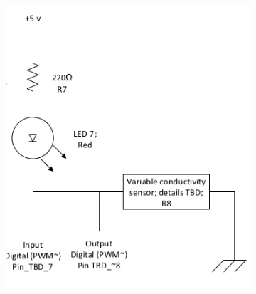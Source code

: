 \documentclass[12pt,letterpaper,oneside]{article}
\begin{document}
\begin{figure}[here]
\begin{subfigure}[b]{0.4\textwidth}
                \includegraphics[width=\textwidth]{images/circuit_5.png}
                \label{fig:sens5}
	        \end{subfigure}
		\end{figure}\\	\\			
\end{document}
